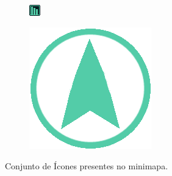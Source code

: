 \documentclass[
	12pt,				%
	openright,			%
	twoside,			%
	a4paper,			%
	english,			%
	french,				%
	spanish,			%
	brazil				%
	]{abntex2}
\begin{document}
\begin{figure}[h!]
\begin{subfigure}[b]{0.1\linewidth}
  \end{subfigure}
  \begin{subfigure}[b]{0.1\linewidth}
    \includegraphics[width=\linewidth]{icon4.jpg}
  \end{subfigure}
  \begin{subfigure}[b]{0.1\linewidth}
    \includegraphics[width=\linewidth]{playericon.png}
  \end{subfigure}
  \caption{Conjunto de Ícones presentes no minimapa.}
  \label{fig:shortcut}
\end{figure}
\end{document}
